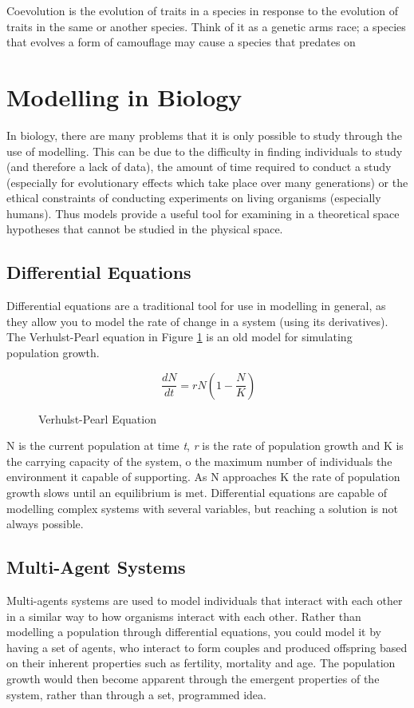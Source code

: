 \documentclass[authoryearcitations]{UoYCSproject}
\begin{document}
\begin{description}[style=nextline]
\item [Coevolution] Coevolution is the evolution of traits in a species in response to the evolution of traits in the  same or another species. Think of it as a genetic arms race; a species that evolves a form of camouflage may cause a species that predates on 

\end{description}


\section{Modelling in Biology}
In biology, there are many problems that it is only possible to study through the use of modelling. This can be due to the difficulty in finding individuals to study (and therefore a lack of data), the amount of time required to conduct a study (especially for evolutionary effects which take place over many generations) or the ethical constraints of conducting experiments on living organisms (especially humans). Thus models provide a useful tool for examining in a theoretical space hypotheses that cannot be studied in the physical space.

\subsection{Differential Equations}
Differential equations are a traditional tool for use in modelling in general, as they allow you to model the rate of change in a system (using its derivatives). The Verhulst-Pearl equation \cite{garnier1838correspondance, pearl1920rate} in Figure \ref{fig:verhulstPearl} is an old model for simulating population growth. 

\begin{figure}[h]
$$\ \frac{dN}{dt} = rN(1-\frac{N}{K}) $$
\caption{Verhulst-Pearl Equation}
\label{fig:verhulstPearl}
\end{figure}

N is the current population at time \textit{t}, \textit{r} is the rate of population growth and K is the carrying capacity of the system, o the maximum number of individuals the environment it capable of supporting. As N approaches K the rate of population growth slows until an equilibrium is met. Differential equations are capable of modelling complex systems with several variables, but reaching a solution is not always possible. 

\subsection{Multi-Agent Systems}
Multi-agents systems are used to model individuals that interact with each other in a similar way to how organisms interact with each other. Rather than modelling a population through differential equations, you could model it by having a set of agents, who interact to form couples and produced offspring based on their inherent properties such as fertility, mortality and age. The population growth would then become apparent through the emergent properties of the system, rather than through a set, programmed idea.
\end{document}
